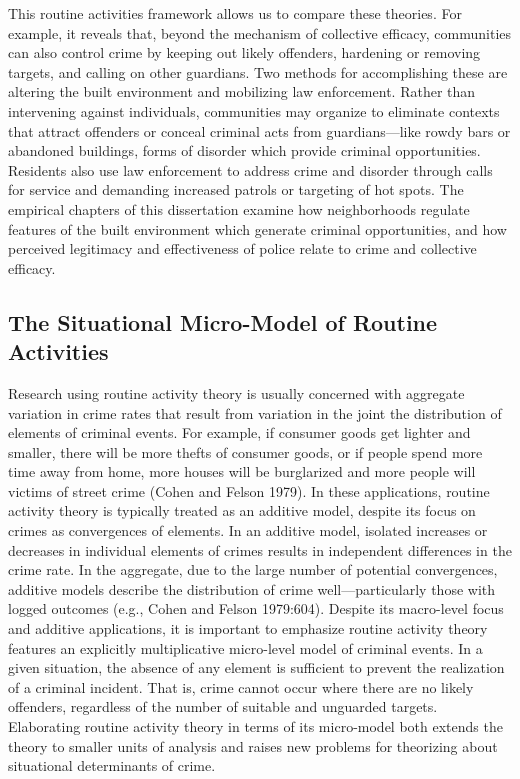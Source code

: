 \documentclass [11pt, proquest] {uwthesis}[2015/03/03]
\begin{document}
This routine activities framework allows us to compare these theories. For example, it reveals that, beyond the mechanism of collective efficacy, communities can also control crime by keeping out likely offenders, hardening or removing targets, and calling on other guardians. Two methods for accomplishing these are altering the built environment and mobilizing law enforcement. Rather than intervening against individuals, communities may organize to eliminate contexts that attract offenders or conceal criminal acts from guardians---like rowdy bars or abandoned buildings, forms of disorder which provide criminal opportunities. Residents also use law enforcement to address crime and disorder through calls for service and demanding increased patrols or targeting of hot spots. The empirical chapters of this dissertation examine how neighborhoods regulate features of the built environment which generate criminal opportunities, and how perceived legitimacy and effectiveness of police relate to crime and collective efficacy.

\hypertarget{the-situational-micro-model-of-routine-activities}{%
\subsection{The Situational Micro-Model of Routine Activities}\label{the-situational-micro-model-of-routine-activities}}

Research using routine activity theory is usually concerned with aggregate variation in crime rates that result from variation in the joint the distribution of elements of criminal events. For example, if consumer goods get lighter and smaller, there will be more thefts of consumer goods, or if people spend more time away from home, more houses will be burglarized and more people will victims of street crime (Cohen and Felson 1979). In these applications, routine activity theory is typically treated as an additive model, despite its focus on crimes as convergences of elements. In an additive model, isolated increases or decreases in individual elements of crimes results in independent differences in the crime rate. In the aggregate, due to the large number of potential convergences, additive models describe the distribution of crime well---particularly those with logged outcomes (e.g., Cohen and Felson 1979:604). Despite its macro-level focus and additive applications, it is important to emphasize routine activity theory features an explicitly multiplicative micro-level model of criminal events. In a given situation, the absence of any element is sufficient to prevent the realization of a criminal incident. That is, crime cannot occur where there are no likely offenders, regardless of the number of suitable and unguarded targets. Elaborating routine activity theory in terms of its micro-model both extends the theory to smaller units of analysis and raises new problems for theorizing about situational determinants of crime.
\end{document}
